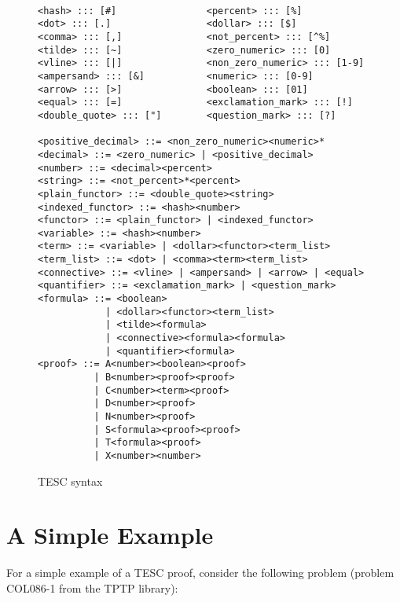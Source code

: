 \documentclass[12pt]{article}
\begin{document}
\begin{figure}
    \centering
\begin{verbatim}

<hash> ::: [#]                <percent> ::: [%]
<dot> ::: [.]                 <dollar> ::: [$]
<comma> ::: [,]               <not_percent> ::: [^%]
<tilde> ::: [~]               <zero_numeric> ::: [0]
<vline> ::: [|]               <non_zero_numeric> ::: [1-9]
<ampersand> ::: [&]           <numeric> ::: [0-9]
<arrow> ::: [>]               <boolean> ::: [01] 
<equal> ::: [=]               <exclamation_mark> ::: [!]
<double_quote> ::: ["]        <question_mark> ::: [?]

<positive_decimal> ::= <non_zero_numeric><numeric>*
<decimal> ::= <zero_numeric> | <positive_decimal>
<number> ::= <decimal><percent>
<string> ::= <not_percent>*<percent>
<plain_functor> ::= <double_quote><string>
<indexed_functor> ::= <hash><number>
<functor> ::= <plain_functor> | <indexed_functor>
<variable> ::= <hash><number>
<term> ::= <variable> | <dollar><functor><term_list>
<term_list> ::= <dot> | <comma><term><term_list>
<connective> ::= <vline> | <ampersand> | <arrow> | <equal>
<quantifier> ::= <exclamation_mark> | <question_mark>
<formula> ::= <boolean>
            | <dollar><functor><term_list>
            | <tilde><formula>
            | <connective><formula><formula>
            | <quantifier><formula> 
<proof> ::= A<number><boolean><proof> 
          | B<number><proof><proof>
          | C<number><term><proof> 
          | D<number><proof>
          | N<number><proof>
          | S<formula><proof><proof> 
          | T<formula><proof>
          | X<number><number>
\end{verbatim}
    \caption{TESC syntax}
    \label{fig:tesc-syntax}
\end{figure}

\section{A Simple Example} \label{sec:example}

For a simple example of a TESC proof, consider the following problem (problem COL086-1 from the TPTP library): 
\end{document}
